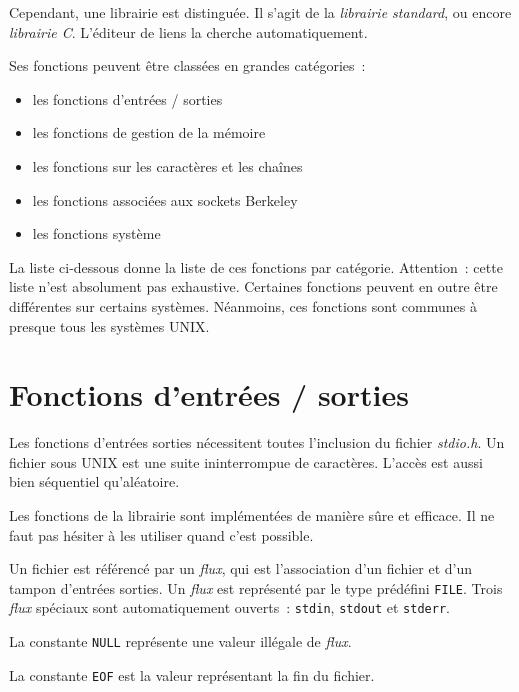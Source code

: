 \documentclass [twoside] {report}
\begin{document}
Cependant, une librairie est distinguée. Il s'agit de la
{\em librairie standard}, ou encore {\em librairie C}. L'éditeur
de liens la cherche automatiquement.

Ses fonctions peuvent être classées en grandes catégories~:

\begin {itemize}
    \item les fonctions d'entrées / sorties
    \item les fonctions de gestion de la mémoire
    \item les fonctions sur les caractères et les chaînes
    \item les fonctions associées aux sockets Berkeley
    \item les fonctions système
\end {itemize}

La liste ci-dessous donne la liste de ces fonctions par
catégorie. Attention~: cette liste n'est absolument pas
exhaustive. Certaines fonctions peuvent en outre être
différentes sur certains systèmes. Néanmoins, ces fonctions
sont communes à presque tous les systèmes UNIX.



\section {Fonctions d'entrées / sorties}


Les fonctions d'entrées sorties nécessitent toutes
l'inclusion du fichier {\em stdio.h}. Un fichier sous UNIX est
une suite ininterrompue de caractères. L'accès est aussi
bien séquentiel qu'aléatoire.

Les fonctions de la librairie sont implémentées de manière
sûre et efficace. Il ne faut pas hésiter à les utiliser
quand c'est possible.

Un fichier est référencé par un {\em flux}, qui est
l'association d'un fichier et d'un tampon d'entrées sorties.
Un {\em flux} est représenté par le type prédéfini {\tt FILE}. Trois
{\em flux} spéciaux sont automatiquement ouverts~: {\tt stdin},
{\tt stdout} et {\tt stderr}.

La constante {\tt NULL} représente une valeur illégale de
{\em flux}.

La constante {\tt EOF} est la valeur représentant la fin du
fichier.
\end{document}
